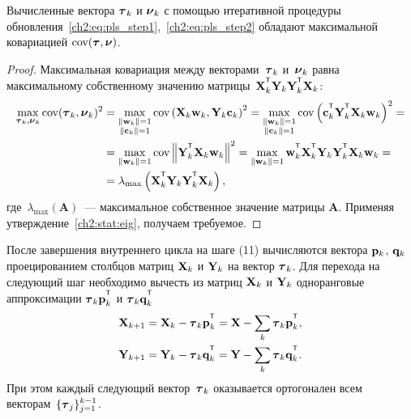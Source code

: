 \begin{statement}
		Вычисленные вектора $\boldsymbol{\tau}_k$ и $\boldsymbol{\nu}_k$ с помощью итеративной процедуры обновления~\eqref{ch2:eq:pls_step1},~\eqref{ch2:eq:pls_step2} обладают максимальной ковариацией $\textnormal{cov}(\boldsymbol{\tau}, \boldsymbol{\nu})$.
\end{statement}
\begin{proof}
	Максимальная ковариация между векторами~$\boldsymbol{\tau}_k$ и~$\boldsymbol{\nu}_k$ равна максимальному собственному значению матрицы~$\bX_k^{\T} \bY_k \bY_k^{\T} \bX_k$:
	\begin{align*}
		\max_{\btau_k, \bnu_k}  \text{cov} (\btau_k, \bnu_k)^2 &= \max_{\substack{\|\bw_k\|=1 \\ \|\bc_k\| = 1}} \text{cov} \left( \bX_k \bw_k, \bY_k \bc_k \right)^2 = \max_{\substack{\|\bw_k\|=1 \\ \|\bc_k\| = 1}} \text{cov} \left(\bc_k^{\T}  \bY_k^{\T} \bX_k \bw_k \right)^2 = \\
		&= \max_{\|\bw_k\| = 1} \text{cov} \left\|\bY_k^{\T} \bX_k \bw_k \right\|^2 = \max_{\|\bw_k\| = 1} \bw_k^{\T} \bX_k^{\T} \bY_k \bY_k^{\T} \bX_k \bw_k = \\
		& = \lambda_{\max} \left( \bX_k^{\T} \bY_k \bY_k^{\T} \bX_k \right),
	\end{align*}
	где~$\lambda_{\max} (\mathbf{A})$~--- максимальное собственное значение матрицы $\mathbf{A}$.
	Применяя утверждение~\ref{ch2:stat:eig}, получаем требуемое.
\end{proof}

После завершения внутреннего цикла на шаге (11) вычисляются вектора $\mathbf{p}_k$, $\mathbf{q}_k$ проецированием столбцов матриц $\mathbf{X}_k$ и $\mathbf{Y}_k$ на вектор $\boldsymbol{\tau}_k$. 
Для перехода на следующий шаг необходимо вычесть из матриц $\mathbf{X}_k$ и $\mathbf{Y}_k$ одноранговые аппроксимации $\btau_k \bp_k^{\T}$ и $\btau_k \bq_k^{\T}$
\begin{align*}
	\bX_{k + 1} &= \bX_{k} - \btau_k \bp_k^{\T} = \bX - \sum_k \btau_k \bp_k^{\T}, \\
	\bY_{k + 1} &= \bY_{k} - \btau_k \bq_k^{\T} = \bY - \sum_k \btau_k \bq_k^{\T}.
\end{align*}
При этом каждый следующий вектор~$\boldsymbol{\tau}_k$ оказывается ортогонален всем векторам~$\{\boldsymbol{\tau}_j\}_{j=1}^{k - 1}$.

